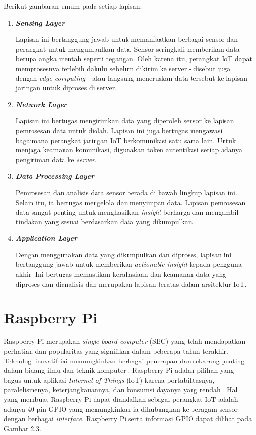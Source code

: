 \noindent Berikut gambaran umum pada setiap lapisan:
\begin{enumerate}
    \item \textbf{\textit{Sensing Layer}}
    
    Lapisan ini bertanggung jawab untuk memanfaatkan berbagai sensor dan perangkat untuk mengumpulkan data. Sensor seringkali memberikan data berupa angka mentah seperti tegangan. Oleh karena itu, perangkat IoT dapat memprosesnya terlebih dahulu sebelum dikirim ke server - disebut juga dengan \textit{edge-computing} - atau langsung meneruskan data tersebut ke lapisan jaringan untuk diproses di server.
    

    \item \textbf{\textit{Network Layer}}
        
    Lapisan ini bertugas mengirimkan data yang diperoleh sensor ke lapisan pemrosesan data untuk diolah. Lapisan ini juga bertugas mengawasi bagaimana perangkat jaringan IoT berkomunikasi satu sama lain. Untuk menjaga keamanan komunikasi, digunakan token autentikasi setiap adanya pengiriman data ke \textit{server}.

    \item \textbf{\textit{Data Processing Layer}}
    
    Pemrosesan dan analisis data sensor berada di bawah lingkup lapisan ini. Selain itu, ia bertugas mengelola dan menyimpan data. Lapisan pemrosesan data sangat penting untuk menghasilkan \textit{insight} berharga dan mengambil tindakan yang sesuai berdasarkan data yang dikumpulkan.
    
    \item \textbf{\textit{Application Layer}}
    
    Dengan menggunakan data yang dikumpulkan dan diproses, lapisan ini bertanggung jawab untuk memberikan \textit{actionable insight} kepada pengguna akhir. Ini bertugas memastikan kerahasiaan dan keamanan data yang diproses dan dianalisis dan merupakan lapisan teratas dalam arsitektur IoT. 

\end{enumerate}

\section{Raspberry Pi}

\noindent Raspberry Pi merupakan \textit{single-board computer} (SBC) yang telah mendapatkan perhatian dan popularitas yang signifikan dalam beberapa tahun terakhir. Teknologi inovatif ini memungkinkan berbagai penerapan dan sekarang penting dalam bidang ilmu dan teknik komputer \parencite{article:johnston}. Raspberry Pi adalah pilihan yang bagus untuk aplikasi \textit{Internet of Things} (IoT) karena portabilitasnya, paralelismenya, keterjangkauannya, dan konsumsi dayanya yang rendah \parencite{article:hosny}. Hal yang membuat Raspberry Pi dapat diandalkan sebagai perangkat IoT adalah adanya 40 pin GPIO yang memungkinkan ia dihubungkan ke beragam sensor dengan berbagai \textit{interface}. Raspberry Pi serta informasi GPIO dapat dilihat pada Gambar 2.3.

